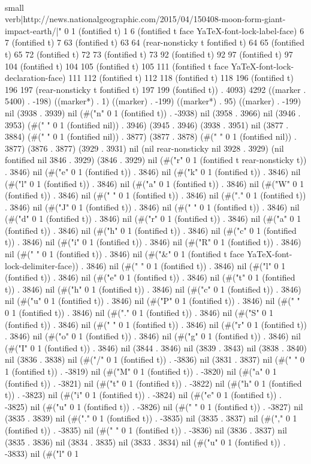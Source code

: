        {\\small \\verb|http://news.nationalgeographic.com/2015/04/150408-moon-form-giant-impact-earth/|}" 0 1 (fontified t) 1 6 (fontified t face YaTeX-font-lock-label-face) 6 7 (fontified t) 7 63 (fontified t) 63 64 (rear-nonsticky t fontified t) 64 65 (fontified t) 65 72 (fontified t) 72 73 (fontified t) 73 92 (fontified t) 92 97 (fontified t) 97 104 (fontified t) 104 105 (fontified t) 105 111 (fontified t face YaTeX-font-lock-declaration-face) 111 112 (fontified t) 112 118 (fontified t) 118 196 (fontified t) 196 197 (rear-nonsticky t fontified t) 197 199 (fontified t)) . 4093) 4292 ((marker . 5400) . -198) ((marker*) . 1) ((marker) . -199) ((marker*) . 95) ((marker) . -199) nil (3938 . 3939) nil (#("n" 0 1 (fontified t)) . -3938) nil (3958 . 3966) nil (3946 . 3953) (#(" " 0 1 (fontified nil)) . 3946) (3945 . 3946) (3938 . 3951) nil (3877 . 3884) (#(" " 0 1 (fontified nil)) . 3877) (3877 . 3878) (#(" " 0 1 (fontified nil)) . 3877) (3876 . 3877) (3929 . 3931) nil (nil rear-nonsticky nil 3928 . 3929) (nil fontified nil 3846 . 3929) (3846 . 3929) nil (#("r" 0 1 (fontified t rear-nonsticky t)) . 3846) nil (#("e" 0 1 (fontified t)) . 3846) nil (#("k" 0 1 (fontified t)) . 3846) nil (#("l" 0 1 (fontified t)) . 3846) nil (#("a" 0 1 (fontified t)) . 3846) nil (#("W" 0 1 (fontified t)) . 3846) nil (#(" " 0 1 (fontified t)) . 3846) nil (#("." 0 1 (fontified t)) . 3846) nil (#("J" 0 1 (fontified t)) . 3846) nil (#(" " 0 1 (fontified t)) . 3846) nil (#("d" 0 1 (fontified t)) . 3846) nil (#("r" 0 1 (fontified t)) . 3846) nil (#("a" 0 1 (fontified t)) . 3846) nil (#("h" 0 1 (fontified t)) . 3846) nil (#("c" 0 1 (fontified t)) . 3846) nil (#("i" 0 1 (fontified t)) . 3846) nil (#("R" 0 1 (fontified t)) . 3846) nil (#(" " 0 1 (fontified t)) . 3846) nil (#("&" 0 1 (fontified t face YaTeX-font-lock-delimiter-face)) . 3846) nil (#("	" 0 1 (fontified t)) . 3846) nil (#("l" 0 1 (fontified t)) . 3846) nil (#("e" 0 1 (fontified t)) . 3846) nil (#("t" 0 1 (fontified t)) . 3846) nil (#("h" 0 1 (fontified t)) . 3846) nil (#("c" 0 1 (fontified t)) . 3846) nil (#("u" 0 1 (fontified t)) . 3846) nil (#("P" 0 1 (fontified t)) . 3846) nil (#(" " 0 1 (fontified t)) . 3846) nil (#("." 0 1 (fontified t)) . 3846) nil (#("S" 0 1 (fontified t)) . 3846) nil (#(" " 0 1 (fontified t)) . 3846) nil (#("r" 0 1 (fontified t)) . 3846) nil (#("o" 0 1 (fontified t)) . 3846) nil (#("g" 0 1 (fontified t)) . 3846) nil (#("I" 0 1 (fontified t)) . 3846) nil (3844 . 3846) nil (3839 . 3843) nil (3838 . 3840) nil (3836 . 3838) nil (#("/" 0 1 (fontified t)) . -3836) nil (3831 . 3837) nil (#(" " 0 1 (fontified t)) . -3819) nil (#("M" 0 1 (fontified t)) . -3820) nil (#("a" 0 1 (fontified t)) . -3821) nil (#("t" 0 1 (fontified t)) . -3822) nil (#("h" 0 1 (fontified t)) . -3823) nil (#("i" 0 1 (fontified t)) . -3824) nil (#("e" 0 1 (fontified t)) . -3825) nil (#("u" 0 1 (fontified t)) . -3826) nil (#(" " 0 1 (fontified t)) . -3827) nil (3835 . 3839) nil (#("." 0 1 (fontified t)) . -3835) nil (3835 . 3837) nil (#("," 0 1 (fontified t)) . -3835) nil (#("	" 0 1 (fontified t)) . -3836) nil (3836 . 3837) nil (3835 . 3836) nil (3834 . 3835) nil (3833 . 3834) nil (#("u" 0 1 (fontified t)) . -3833) nil (#("l" 0 1 